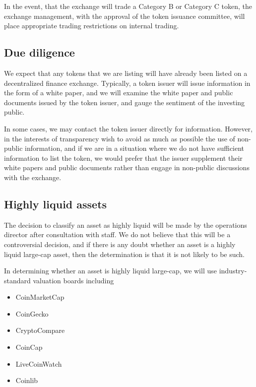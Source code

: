 In the event, that the exchange will trade a Category B or Category C
token, the exchange management, with the approval of the token issuance
committee, will place appropriate trading restrictions on internal
trading.


\subsection{Due diligence}

We expect that any tokens that we are listing will have already been
listed on a decentralized finance exchange.  Typically, a token issuer
will issue information in the form of a white paper, and we will
examine the white paper and public documents issued by the token
issuer, and gauge the sentiment of the investing public.

In some cases, we may contact the token issuer directly for
information.  However, in the interests of transparency wish to avoid
as much as possible the use of non-public information, and if we are
in a situation where we do not have sufficient information to list the
token, we would prefer that the issuer supplement their white papers
and public documents rather than engage in non-public discussions with
the exchange.

\subsection{Highly liquid assets}

The decision to classify an asset as highly liquid will be made by the
operations director after consultation with staff.  We do not believe
that this will be a controversial decision, and if there is any doubt
whether an asset is a highly liquid large-cap asset, then
the determination is that it is not likely to be such.

In determining whether an asset is highly liquid large-cap, we will
use industry-standard valuation boards including
\begin{itemize}
\item CoinMarketCap
\item CoinGecko
\item CryptoCompare
\item CoinCap
\item LiveCoinWatch
\item Coinlib
\end{itemize}

